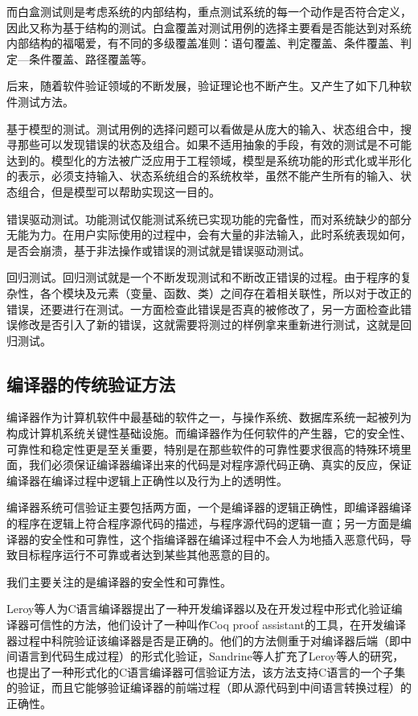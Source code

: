 而白盒测试则是考虑系统的内部结构，重点测试系统的每一个动作是否符合定义，因此又称为基于结构的测试。白盒覆盖对测试用例的选择主要看是否能达到对系统内部结构的福噶爱，有不同的多级覆盖准则：语句覆盖、判定覆盖、条件覆盖、判定—条件覆盖、路径覆盖等。

后来，随着软件验证领域的不断发展，验证理论也不断产生。又产生了如下几种软件测试方法。

基于模型的测试。测试用例的选择问题可以看做是从庞大的输入、状态组合中，搜寻那些可以发现错误的状态及组合。如果不适用抽象的手段，有效的测试是不可能达到的。模型化的方法被广泛应用于工程领域，模型是系统功能的形式化或半形化的表示，必须支持输入、状态系统组合的系统枚举，虽然不能产生所有的输入、状态组合，但是模型可以帮助实现这一目的。

错误驱动测试。功能测试仅能测试系统已实现功能的完备性，而对系统缺少的部分无能为力。在用户实际使用的过程中，会有大量的非法输入，此时系统表现如何，是否会崩溃，基于非法操作或错误的测试就是错误驱动测试。

回归测试。回归测试就是一个不断发现测试和不断改正错误的过程。由于程序的复杂性，各个模块及元素（变量、函数、类）之间存在着相关联性，所以对于改正的错误，还要进行在测试。一方面检查此错误是否真的被修改了，另一方面检查此错误修改是否引入了新的错误，这就需要将测过的样例拿来重新进行测试，这就是回归测试。

\subsection{编译器的传统验证方法}
编译器作为计算机软件中最基础的软件之一，与操作系统、数据库系统一起被列为构成计算机系统关键性基础设施。而编译器作为任何软件的产生器，它的安全性、可靠性和稳定性更是至关重要，特别是在那些软件的可靠性要求很高的特殊环境里面，我们必须保证编译器编译出来的代码是对程序源代码正确、真实的反应，保证编译器在编译过程中逻辑上正确性以及行为上的透明性。

编译器系统可信验证主要包括两方面，一个是编译器的逻辑正确性，即编译器编译的程序在逻辑上符合程序源代码的描述，与程序源代码的逻辑一直；另一方面是编译器的安全性和可靠性，这个指编译器在编译过程中不会人为地插入恶意代码，导致目标程序运行不可靠或者达到某些其他恶意的目的。

我们主要关注的是编译器的安全性和可靠性。

Leroy等人为C语言编译器提出了一种开发编译器以及在开发过程中形式化验证编译器可信性的方法，他们设计了一种叫作Coq proof assistant的工具，在开发编译器过程中科院验证该编译器是否是正确的。他们的方法侧重于对编译器后端（即中间语言到代码生成过程）的形式化验证，Sandrine等人扩充了Leroy等人的研究，也提出了一种形式化的C语言编译器可信验证方法，该方法支持C语言的一个子集的验证，而且它能够验证编译器的前端过程（即从源代码到中间语言转换过程）的正确性。

